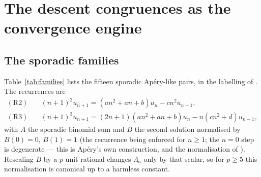 \documentclass[11pt,reqno]{article}
\theoremstyle{plain}
\theoremstyle{definition}
\theoremstyle{remark}
\numberwithin{equation}{section}
\begin{document}
\section{The descent congruences as the convergence engine}\label{sec:engine}

\subsection{The sporadic families}\label{ss:families}

Table~\ref{tab:families} lists the fifteen sporadic Ap\'ery-like pairs, in the
labelling of \cite{MalikStraub}.  The recurrences are
\begin{align}
  (\mathrm{R}2)&\quad (n+1)^2u_{n+1}=(an^2+an+b)u_n-cn^2u_{n-1},\label{eq:R2}\\
  (\mathrm{R}3)&\quad (n+1)^3u_{n+1}=(2n+1)(an^2+an+b)u_n-n(cn^2+d)u_{n-1},\label{eq:R3}
\end{align}
with $A$ the sporadic binomial sum and $B$ the second solution normalised by
$B(0)=0$, $B(1)=1$ (the recurrence being enforced for $n\ge1$; the $n=0$ step is
degenerate --- this is Ap\'ery's own construction, and the normalisation of
\cite{ChamberlandStraub}).  Rescaling $B$ by a $p$-unit
rational changes $\Lambda_a$ only by that scalar, so for $p\ge5$ this
normalisation is canonical up to a harmless constant.
\end{document}
